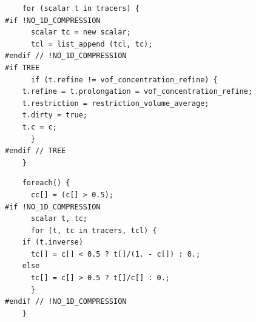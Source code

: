 \documentclass[a4paper]{article}
\newcommand{\func}[1]{\textbf{\textcolor{function}{#1}}}
\newcommand{\para}[1]{\textbf{\emph{\textcolor{para}{#1}}}}
\begin{document}
\begin{center}
\end{center}

\begin{multicols}{2}
 \columnbreak
 \begin{verbatim}
    for (scalar t in tracers) {
#if !NO_1D_COMPRESSION
      scalar tc = new scalar;
      tcl = list_append (tcl, tc);
#endif // !NO_1D_COMPRESSION
#if TREE
      if (t.refine != vof_concentration_refine) {
	t.refine = t.prolongation = vof_concentration_refine;
	t.restriction = restriction_volume_average;
	t.dirty = true;
	t.c = c;
      }
#endif // TREE
    }
 \end{verbatim}
\end{multicols}

\begin{center}
\end{center}

\newpage
\begin{multicols}{2}
 \columnbreak
 \begin{verbatim}
    foreach() {
      cc[] = (c[] > 0.5);
#if !NO_1D_COMPRESSION
      scalar t, tc;
      for (t, tc in tracers, tcl) {
	if (t.inverse)
	  tc[] = c[] < 0.5 ? t[]/(1. - c[]) : 0.;
	else
	  tc[] = c[] > 0.5 ? t[]/c[] : 0.;
      }
#endif // !NO_1D_COMPRESSION
    }
 \end{verbatim}
\end{multicols}
\end{document}
